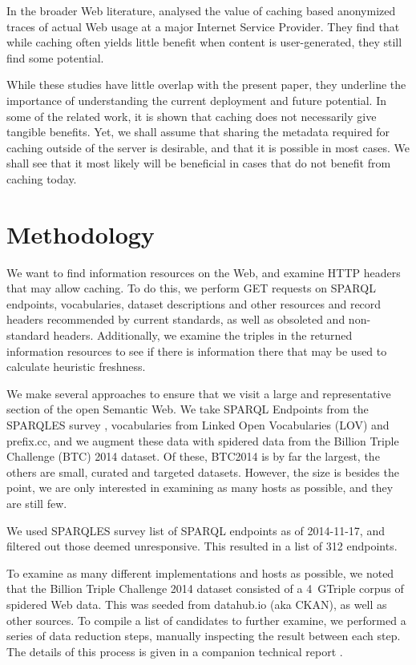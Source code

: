 \documentclass{llncs}
\begin{document}
In the broader Web literature, \cite{ager2010revisiting} analysed the
value of caching based anonymized traces of actual Web usage at a
major Internet Service Provider. They find that while caching often
yields little benefit when content is user-generated, they still find
some potential.

While these studies have little overlap with the present paper, they
underline the importance of understanding the current deployment and
future potential. In some of the related work, it is shown that
caching does not necessarily give tangible benefits. Yet, we shall
assume that sharing the metadata required for caching outside of the
server is desirable, and that it is possible in most cases. We shall
see that it most likely will be beneficial in cases that do not
benefit from caching today.

\section{Methodology}
We want to find information resources on the Web, and examine HTTP
headers that may allow caching. To do this, we perform GET requests on
SPARQL endpoints, vocabularies, dataset descriptions and other
resources and record headers recommended by current standards, as well
as obsoleted and non-standard headers. Additionally, we examine the
triples in the returned information resources to see if there is
information there that may be used to calculate heuristic freshness.

We make several approaches to ensure that we visit a large and
representative section of the open Semantic Web. We take SPARQL
Endpoints from the SPARQLES survey \cite{buil2013sparql}, vocabularies
from Linked Open Vocabularies (LOV) \cite{lov2} and prefix.cc, and we
augment these data with spidered data from the Billion Triple
Challenge (BTC) 2014 \cite{btc-2014} dataset. Of these, BTC2014 is by
far the largest, the others are small, curated and targeted
datasets. However, the size is besides the point, we are only
interested in examining as many hosts as possible, and they are still
few.

We used SPARQLES survey list of SPARQL endpoints as of 2014-11-17, and
filtered out those deemed unresponsive. This resulted in a
list of 312 endpoints.

To examine as many different implementations and hosts as possible, we
noted that the Billion Triple Challenge 2014 \cite{btc-2014} dataset
consisted of a 4~GTriple corpus of spidered Web data. This was seeded
from datahub.io (aka CKAN), as well as other sources. To compile a list of
candidates to further examine, we performed a series of data reduction
steps, manually inspecting the result between each step. The details
of this process is given in a companion technical report
\cite{kjernsmo_add_survey_2015}.
\end{document}
